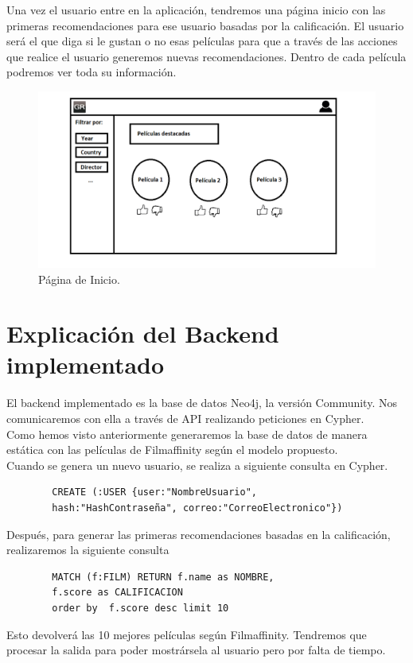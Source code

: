 \documentclass[12pt,a4paper]{article}
\begin{document}
		Una vez el usuario entre en la aplicación, tendremos una página inicio con las primeras recomendaciones para ese usuario basadas por la calificación. El usuario será el que diga si le gustan o no esas películas para que a través de las acciones que realice el usuario generemos nuevas recomendaciones.
		Dentro de cada película podremos ver toda su información. 
		\begin{figure}[tbph!]
			\centering
			\includegraphics[width=0.7\linewidth]{images/Pagina_Inicio}
			\caption{Página de Inicio.}
			\label{fig:Inicio}
		\end{figure}
		
		
		\clearpage
		\section{Explicación del Backend implementado}
		El backend implementado es la base de datos Neo4j, la versión Community. Nos comunicaremos con ella a través de API realizando peticiones en Cypher.\\
		
		Como hemos visto anteriormente generaremos la base de datos de manera estática con las películas de Filmaffinity según el modelo propuesto.\\
		
		Cuando se genera un nuevo usuario, se realiza a siguiente consulta en Cypher.
		\begin{verbatim}
		CREATE (:USER {user:"NombreUsuario",
		hash:"HashContraseña", correo:"CorreoElectronico"})
		\end{verbatim}
		
		Después, para generar las primeras recomendaciones basadas en la calificación, realizaremos la siguiente consulta
		
		\begin{verbatim}
		MATCH (f:FILM) RETURN f.name as NOMBRE,
		f.score as CALIFICACION 
		order by  f.score desc limit 10
		\end{verbatim}
		
		Esto devolverá las 10 mejores películas según Filmaffinity. Tendremos que procesar la salida para poder mostrársela al usuario pero por falta de tiempo.\\
		
\end{document}
